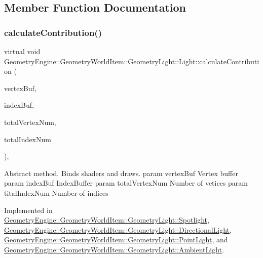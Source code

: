 \subsection{Member Function Documentation}
\mbox{\label{class_geometry_engine_1_1_geometry_world_item_1_1_geometry_light_1_1_light_a58aa2a3520f7aa2b03afcb4123e7530a}} 
\subsubsection{\texorpdfstring{calculateContribution()}{calculateContribution()}}
{\footnotesize\ttfamily virtual void Geometry\+Engine\+::\+Geometry\+World\+Item\+::\+Geometry\+Light\+::\+Light\+::calculate\+Contribution (\begin{DoxyParamCaption}\item[{Q\+Open\+G\+L\+Buffer $\ast$}]{vertex\+Buf,  }\item[{Q\+Open\+G\+L\+Buffer $\ast$}]{index\+Buf,  }\item[{unsigned int}]{total\+Vertex\+Num,  }\item[{unsigned int}]{total\+Index\+Num }\end{DoxyParamCaption})\hspace{0.3cm}{\ttfamily [protected]}, {}}

Abstract method. Binds shaders and draws. param vertex\+Buf Vertex buffer param index\+Buf Index\+Buffer param total\+Vertex\+Num Number of vetices param tital\+Index\+Num Number of indices 

Implemented in \mbox{\hyperlink{class_geometry_engine_1_1_geometry_world_item_1_1_geometry_light_1_1_spotlight_a6136ca2338a7b5f5be70ccab82fe655e}{Geometry\+Engine\+::\+Geometry\+World\+Item\+::\+Geometry\+Light\+::\+Spotlight}}, \mbox{\hyperlink{class_geometry_engine_1_1_geometry_world_item_1_1_geometry_light_1_1_directional_light_af1eac6f1aac9388efe95e1a898cf600f}{Geometry\+Engine\+::\+Geometry\+World\+Item\+::\+Geometry\+Light\+::\+Directional\+Light}}, \mbox{\hyperlink{class_geometry_engine_1_1_geometry_world_item_1_1_geometry_light_1_1_point_light_aa30244fd20e61fdfe1ac1d85c99fd154}{Geometry\+Engine\+::\+Geometry\+World\+Item\+::\+Geometry\+Light\+::\+Point\+Light}}, and \mbox{\hyperlink{class_geometry_engine_1_1_geometry_world_item_1_1_geometry_light_1_1_ambient_light_a4f1d4fb9ad25626e15c28de03b610b4f}{Geometry\+Engine\+::\+Geometry\+World\+Item\+::\+Geometry\+Light\+::\+Ambient\+Light}}.

